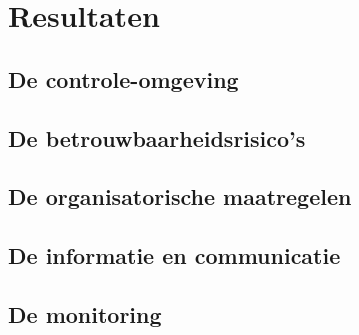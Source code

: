 \chapter{Resultaten}
\label{hoofdstuk:resultaten}
\section{De controle-omgeving}

\section{De betrouwbaarheidsrisico's}

\section{De organisatorische maatregelen}

\section{De informatie en communicatie}

\section{De monitoring}
